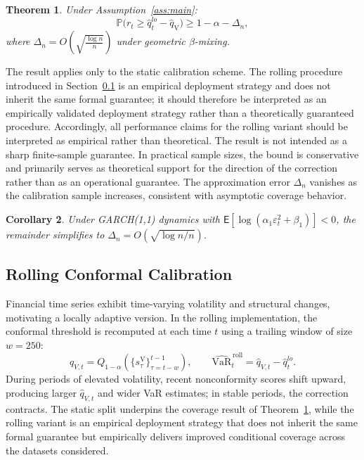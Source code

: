 \documentclass[preprint,11pt,authoryear]{elsarticle}
\newtheorem{theorem}{Theorem}[section]
\newtheorem{corollary}[theorem]{Corollary}
\newcommand{\VaR}{\mathrm{VaR}}
\newcommand{\E}{\mathsf{E}}
\newcommand{\1}{\boldsymbol{1}}
\newcommand{\qV}{\hat{q}_{\scriptscriptstyle\mathrm{V}}}
\begin{document}
	\begin{theorem}
		\label{thm:dependent_conformal_var}
		Under Assumption~\ref{ass:main}:
		\[
		\mathbb{P}\big(r_{t} \geq \hat{q}_t^{lo} - \qV\big)
		\ge 1 - \alpha - \Delta_n,
		\]
		where $\Delta_n = O\!\left(\sqrt{\frac{\log n}{n}}\right)$
		under geometric $\beta$-mixing.
	\end{theorem}
	
	The result applies only to the static calibration scheme. The rolling procedure introduced in Section~\ref{sec:rolling_method} is an empirical deployment strategy and does not inherit the same formal guarantee; it should therefore be interpreted as an empirically validated deployment strategy rather than a theoretically guaranteed procedure. Accordingly, all performance claims for the rolling variant should be interpreted as empirical rather than theoretical.
	The result is not intended as a sharp finite-sample guarantee. In practical sample sizes, the bound is conservative and primarily serves as theoretical support for the direction of the correction rather than as an operational guarantee.
	The approximation error $\Delta_n$ vanishes as the
	calibration sample increases, consistent with asymptotic coverage behavior.

	\begin{corollary}
		\label{cor:garch_conformal_var}
		Under GARCH(1,1) dynamics with
		$\E[\log(\alpha_1\varepsilon_t^2 + \beta_1)] < 0$, the
		remainder simplifies to
		$\Delta_n = O(\sqrt{\log n / n})$.
	\end{corollary}
	
	\subsection{Rolling Conformal Calibration}
	\label{sec:rolling_method}
	
	Financial time series exhibit time-varying volatility and
	structural changes, motivating a locally adaptive version. In
	the rolling implementation, the conformal threshold is
	recomputed at each time $t$ using a trailing window of size
	$w = 250$:
	\begin{equation}
		\hat{q}_{V,t} = Q_{1-\alpha}\!\left(
		\{s_\tau^{\mathrm{V}}\}_{\tau=t-w}^{t-1}\right),
		\qquad
		\widehat{\VaR}_t^{\,\mathrm{roll}}
		= \hat{q}_{V,t} - \hat{q}_t^{lo}.
		\label{eq:rolling_qv}
	\end{equation}
	During periods of elevated volatility, recent nonconformity
	scores shift upward, producing larger $\hat{q}_{V,t}$ and
	wider VaR estimates; in stable periods, the correction
	contracts. The static split underpins the coverage result of
	Theorem~\ref{thm:dependent_conformal_var}, while the rolling
	variant is an empirical deployment strategy that does not
	inherit the same formal guarantee but empirically delivers
	improved conditional coverage across the datasets considered.
\end{document}
